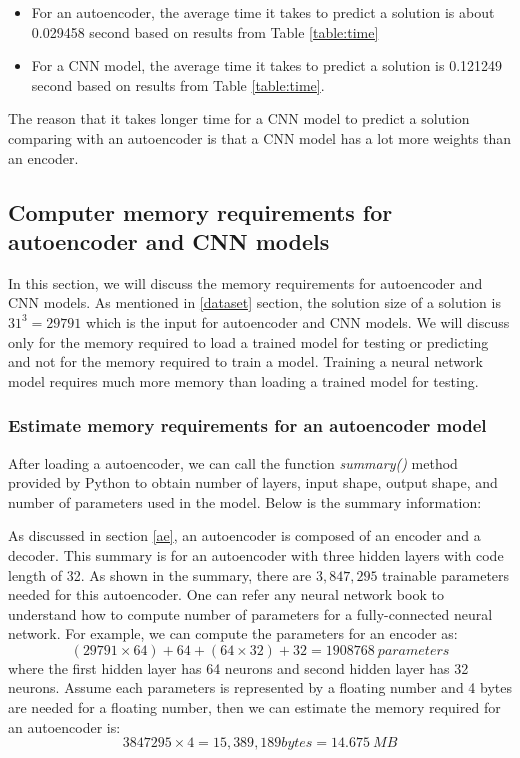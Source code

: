 \documentclass{article}
\begin{document}
\begin{itemize}
	\item For an autoencoder, the average time it takes to predict a solution is about 0.029458 second based on results from Table \ref{table:time}
	\item For a CNN model, the average time it takes to predict a solution is 0.121249 second based on results from Table \ref{table:time}. 	
\end{itemize}
The reason that it takes longer time for a CNN model to predict a solution comparing with an autoencoder is that a CNN model has a lot more weights than an encoder.

\subsection{Computer memory requirements for autoencoder and CNN models}
In this section, we will discuss the memory requirements for autoencoder and CNN models. As mentioned in \ref{dataset} section, the solution size of a solution is $31^3 = 29791$ which is the input for autoencoder and CNN models. We will discuss only for the memory required to load a trained model for testing or predicting and not for the memory required to train a model. Training a neural network model requires much more memory than loading a trained model for testing.

\subsubsection{Estimate memory requirements for an autoencoder model}
After loading a autoencoder, we can call the function \emph{summary()} method provided by Python to obtain number of layers, input shape, output shape, and number of parameters used in the model. Below is the summary information:


As discussed in section \ref{ae}, an autoencoder is composed of an encoder and a decoder. This summary is for an autoencoder with three hidden layers with code length of 32. As shown in the summary, there are $3,847,295$ trainable parameters needed for this autoencoder. One can refer any neural network book to understand how to compute number of parameters for a fully-connected neural network. For example, we can compute the parameters for an encoder as:
\[
(29791 \times 64) + 64 + (64 \times 32) + 32 = 1908768 \ parameters
\]
where the first hidden layer has 64 neurons and second hidden layer has 32 neurons.
Assume each parameters is represented by a floating number and 4 bytes are needed for a floating number, then we can estimate the  memory required for an autoencoder is:
\[ 3847295 \times 4 = 15,389,189 bytes = 14.675 \ MB \]
\end{document}
